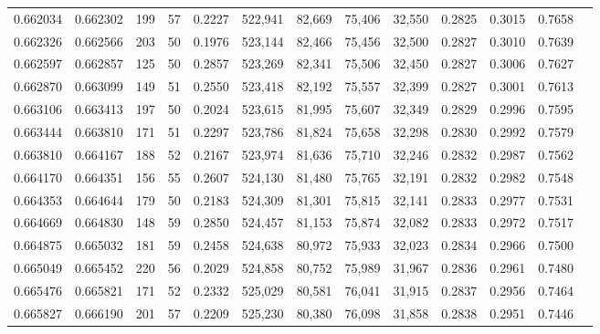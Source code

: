 \begin{tabular}{rrrrrrrrrrrrr}
0.662034 & 0.662302 &    199 &    57 &                                     0.2227 & 522,941 &  82,669 &  75,406 &  32,550 & 0.2825 & 0.3015 & 0.7658 \\
0.662326 & 0.662566 &    203 &    50 &                                     0.1976 & 523,144 &  82,466 &  75,456 &  32,500 & 0.2827 & 0.3010 & 0.7639 \\
0.662597 & 0.662857 &    125 &    50 &                                     0.2857 & 523,269 &  82,341 &  75,506 &  32,450 & 0.2827 & 0.3006 & 0.7627 \\
0.662870 & 0.663099 &    149 &    51 &                                     0.2550 & 523,418 &  82,192 &  75,557 &  32,399 & 0.2827 & 0.3001 & 0.7613 \\
0.663106 & 0.663413 &    197 &    50 &                                     0.2024 & 523,615 &  81,995 &  75,607 &  32,349 & 0.2829 & 0.2996 & 0.7595 \\
0.663444 & 0.663810 &    171 &    51 &                                     0.2297 & 523,786 &  81,824 &  75,658 &  32,298 & 0.2830 & 0.2992 & 0.7579 \\
0.663810 & 0.664167 &    188 &    52 &                                     0.2167 & 523,974 &  81,636 &  75,710 &  32,246 & 0.2832 & 0.2987 & 0.7562 \\
0.664170 & 0.664351 &    156 &    55 &                                     0.2607 & 524,130 &  81,480 &  75,765 &  32,191 & 0.2832 & 0.2982 & 0.7548 \\
0.664353 & 0.664644 &    179 &    50 &                                     0.2183 & 524,309 &  81,301 &  75,815 &  32,141 & 0.2833 & 0.2977 & 0.7531 \\
0.664669 & 0.664830 &    148 &    59 &                                     0.2850 & 524,457 &  81,153 &  75,874 &  32,082 & 0.2833 & 0.2972 & 0.7517 \\
0.664875 & 0.665032 &    181 &    59 &                                     0.2458 & 524,638 &  80,972 &  75,933 &  32,023 & 0.2834 & 0.2966 & 0.7500 \\
0.665049 & 0.665452 &    220 &    56 &                                     0.2029 & 524,858 &  80,752 &  75,989 &  31,967 & 0.2836 & 0.2961 & 0.7480 \\
0.665476 & 0.665821 &    171 &    52 &                                     0.2332 & 525,029 &  80,581 &  76,041 &  31,915 & 0.2837 & 0.2956 & 0.7464 \\
0.665827 & 0.666190 &    201 &    57 &                                     0.2209 & 525,230 &  80,380 &  76,098 &  31,858 & 0.2838 & 0.2951 & 0.7446 \\

\end{tabular}
